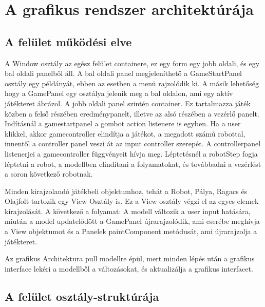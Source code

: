 \section{A grafikus rendszer architektúrája}

\subsection{A felület működési elve}
	A Window osztály az egész felület containere, ez egy form egy jobb oldali, és egy bal oldali panelből áll. A bal oldali panel megjeleníthető a GameStartPanel osztály egy példányát, ebben az esetben
	a menü rajzolódik ki. A másik lehetőség hogy a GamePanel egy osztálya jelenik meg a bal oldalon,
	ami egy aktív játékteret ábrázol.
	A jobb oldali panel szintén container. Ez tartalmazza játék közben a felső részében eredménypanelt, illetve az alsó részében a vezérlő panelt.
	Indításnál a gamestartpanel a gombot action listenere is egyben. Ha a user klikkel, akkor gamecontroller elindítja a játékot, a megadott számú robottal, innentől a controller panel veszi át az input controller szerepét. 
	A controllerpanel listenerjei a gamecontroller függvényeit hívja meg. Léptetésnél a robotStep fogja léptetni a robot, a modellben elindítani a folyamatokat, és továbbadni a vezérlést a soron következő robotnak.
	
	Minden kirajzolandó játékbeli objektumhoz, tehát a Robot, Pálya, Ragacs és Olajfolt tartozik egy View Osztály is. Ez a View osztály végzi el az egyes elemek kirajzolását. A következő a folyamat: A modell változik a user input hatására, miután a model updatelődött a GamePanel újrarajzolódik, ami cserébe meghívja a View objektumot és a Panelek paintComponent metódusát, ami újrarajzolja a játékteret.
	 
	Az grafikus Architektura pull modellre épül, mert minden lépés után a grafikus interface lekéri a modellből a változásokat, és aktualizálja a grafikus interfacet.
	\clearpage
\subsection{A felület osztály-struktúrája}


